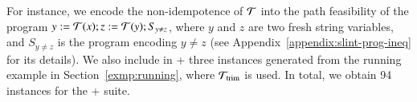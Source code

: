 %
For instance, we encode the non-idempotence of $\mathcal{T}$ into the path feasibility of the {\slint} program $y:=\mathcal{T}(x); z:=\mathcal{T}(y); S_{y \neq z}$, where $y$ and $z$ are two fresh string variables, and $S_{y \neq z}$ is the {\slint} program encoding $y \neq z$ (see Appendix~\ref{appendix:slint-prog-ineq} for its details). We also include in {\transducerbench+} three instances generated from the running example in Section~\ref{exmp:running}, 
where $\mathcal{T}_{\rm trim}$ is used. 
In total, we obtain 94 instances for the {\transducerbench+} suite. 
%
%
%
%

